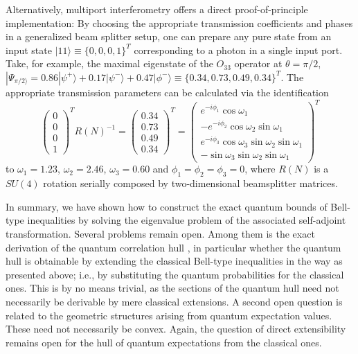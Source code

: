 \documentclass[prl,showpacs,showkeys,amsfonts,amsmath,twocolumn]{revtex4}
\begin{document}
Alternatively, multiport interferometry \cite{rzbb,zukowski-97,svozil-2004-analog}
offers a direct proof-of-principle
implementation:
By choosing the appropriate transmission coefficients and phases in a generalized
beam splitter setup, one can prepare any pure state
from an input state $|11 \rangle \equiv \{0,0,0,1\}^T$ corresponding to a photon
in a single input port. Take, for example, the maximal eigenstate of
the $O_{33}$ operator at $\theta=\pi/2$, $|\Psi_{\pi/2 \rangle}= 0.86
  |\psi^+ \rangle + 0.17|\psi^- \rangle + 0.47|\phi^- \rangle \equiv
  \{0.34,0.73,0.49,0.34\}^T$. The appropriate transmission parameters
  can be calculated via the identification \cite{rzbb}
  \begin{equation}
    \begin{pmatrix}0\\0\\0\\1\end{pmatrix}^T R(N)^{-1} =  \begin{pmatrix}0.34\\0.73\\0.49\\0.34\end{pmatrix}^T =
    \begin{pmatrix}e^{-i\phi_1}\cos\omega_1 \\-e^{-i\phi_2}\cos\omega_2\sin\omega_1\\e^{-i\phi_3}\cos\omega_3\sin\omega_2\sin\omega_1\\-\sin\omega_3\sin\omega_2\sin\omega_1\end{pmatrix}^T
  \end{equation}
to $\omega_1 = 1.23$, $\omega_2=2.46$, $\omega_3=0.60$ and $\phi_1=\phi_2=\phi_3=0$,
where $R(N)$ is a
$SU(4)$ rotation serially composed by two-dimensional beamsplitter
matrices.


In summary, we have shown how to construct the exact quantum bounds of
Bell-type inequalities
by solving the eigenvalue problem of the associated self-adjoint
transformation.
Several problems remain open.
Among them is
the exact derivation of the quantum correlation hull \cite{pit:range-2001,filipp-svo-04-qpoly},
in particular whether the quantum hull is obtainable by extending the
classical Bell-type
inequalities in the way as presented above;
i.e., by substituting the quantum probabilities for the classical ones.
This is by no means trivial,
as the sections of the quantum hull need not necessarily be derivable by mere classical extensions.
A second open question is related to the geometric structures arising from quantum expectation values.
These need not necessarily be convex.
Again, the question of direct extensibility remains open for the hull of
quantum expectations from the classical ones.
\end{document}

